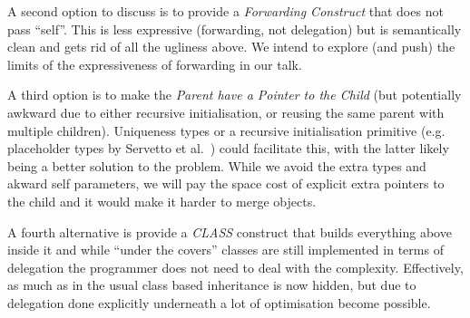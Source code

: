 \documentclass[preprint]{sigplanconf}
\begin{document}
A second option to discuss is to provide a \textit{Forwarding Construct} that does not pass ``self''. This is less expressive (forwarding, not delegation) but is semantically clean and gets rid of all the ugliness above. We intend to explore (and push) the limits of the expressiveness of forwarding in our talk.


A third option is to make the \textit{Parent have a Pointer to the Child} (but potentially awkward due to either recursive initialisation, or reusing the same parent with multiple children). Uniqueness types or a recursive initialisation primitive (e.g. placeholder types by Servetto et al.~\cite{servetto:2013:billion}) could facilitate this, with the latter likely being a better solution to the problem. While we avoid the extra types and akward self parameters, we will pay the space cost of explicit extra pointers to the child and it would make it harder to merge objects.

A fourth alternative is provide a \textit{CLASS} construct that builds everything above inside it and while ``under the covers'' classes are still implemented in terms of delegation the programmer does not need to deal with the complexity. Effectively, as much as in the usual class based inheritance is now hidden, but due to delegation done explicitly underneath a lot of optimisation become possible.

\end{document}
